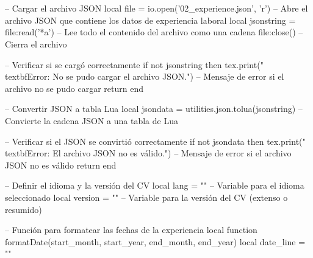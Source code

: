 \section*{\workExperienceTitle} %
\vspace{-20pt}
\noindent\makebox[\linewidth]{\rule{\textwidth}{0.4pt}} %
\vspace{-10pt}

\setlength{\leftskip}{0pt} %
\setlength{\rightskip}{0pt plus 1fil} %
\raggedright %

\begin{luacode}
-- Cargar el archivo JSON
local file = io.open('02_experience.json', 'r') -- Abre el archivo JSON que contiene los datos de experiencia laboral
local jsonstring = file:read('*a') -- Lee todo el contenido del archivo como una cadena
file:close() -- Cierra el archivo

-- Verificar si se cargó correctamente
if not jsonstring then
    tex.print("\\textbf{Error: No se pudo cargar el archivo JSON.}") -- Mensaje de error si el archivo no se pudo cargar
    return
end

-- Convertir JSON a tabla Lua
local jsondata = utilities.json.tolua(jsonstring) -- Convierte la cadena JSON a una tabla de Lua

-- Verificar si el JSON se convirtió correctamente
if not jsondata then
    tex.print("\\textbf{Error: El archivo JSON no es válido.}") -- Mensaje de error si el archivo JSON no es válido
    return
end

-- Definir el idioma y la versión del CV
local lang = "\cvLang" -- Variable para el idioma seleccionado
local version = "\cvVersion" -- Variable para la versión del CV (extenso o resumido)

-- Función para formatear las fechas de la experiencia
local function formatDate(start_month, start_year, end_month, end_year)
    local date_line = ""


\end{luacode}
